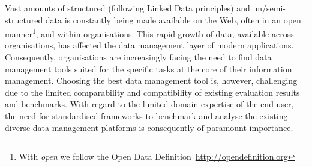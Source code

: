 \documentclass{llncs}
\begin{document}
Vast amounts of structured (following Linked Data principles) and un/semi-structured data is constantly being made available on the Web, often in an open manner\footnote{With \emph{open} we follow the Open Data Definition~\url{http://opendefinition.org}}, and within organisations.
This rapid growth of data, available across organisations, has affected the data management layer of modern applications. 
Consequently,
organisations are increasingly facing the need to find data management tools suited for the specific tasks at the core of their information management. 
Choosing the best data management tool is, however, challenging due to the limited comparability and compatibility of existing evaluation results and benchmarks. 
With regard to the limited domain expertise of the end user, 
the need for standardised frameworks to benchmark and analyse the existing diverse data management platforms is consequently of paramount importance.
\end{document}
